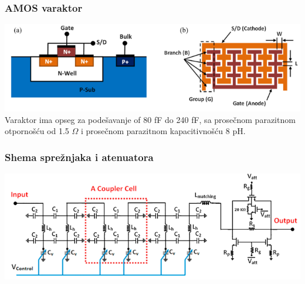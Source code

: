 \documentclass{beamer}
\begin{document}
\begin{frame}
\frametitle{AMOS varaktor}
    \includegraphics[width=\textwidth]{amos_varactor.png}
    Varaktor ima opseg za podešavanje of 80 fF do 240 fF, sa prosečnom parazitnom otpornošću od 1.5 $\Omega$ i prosečnom parazitnom kapacitivnošću 8 pH.

\end{frame}




\begin{frame}
  \frametitle{Shema sprežnjaka i atenuatora}
  \includegraphics[width=\textwidth]{proposed_sch_coupler_cells_attenuator.png}

\end{frame}
\end{document}
